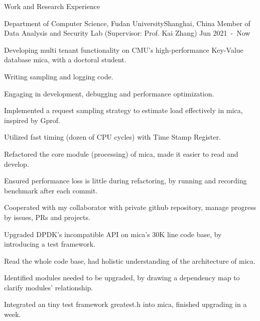 \documentclass{resume} %
\begin{document}
\begin{rSection}{Work and Research Experience}



\begin{rSubsection}
{Department of Computer Science, Fudan University}{Shanghai, China}
{Member of Data Analysis and Security Lab (Supervisor: Prof. Kai Zhang)} {Jun 2021\ -\ Now}

\item Developing multi tenant functionality on CMU's high-performance Key-Value database mica, with a doctoral student.
\begin{mySecondItemize}
    \item Writing sampling and logging code.
    \item Engaging in development, debugging and performance optimization.
\end{mySecondItemize}
\item Implemented a request sampling strategy to estimate load effectively in mica, inspired by Gprof.
\begin{mySecondItemize}
    \item Utilized fast timing (dozen of CPU cycles) with Time Stamp Register.
    \item Refactored the core module (processing) of mica, made it easier to read and develop.
    \item Ensured performance loss is little during refactoring, by running and recording benchmark after each commit.
    \item Cooperated with my collaborator with private github repository, manage progress by issues, PRs and projects.
\end{mySecondItemize}
\item Upgraded DPDK's incompatible API on mica's 30K line code base, by introducing a test framework.
\begin{mySecondItemize}
    \item Read the whole code base, had holistic understanding of the architecture of mica.
    \item Identified modules needed to be upgraded, by drawing a dependency map to clarify modules' relationship.
    \item Integrated an tiny test framework greatest.h into mica, finished upgrading in a week.
\end{mySecondItemize}



\end{rSubsection}
\end{rSection}
\end{document}
